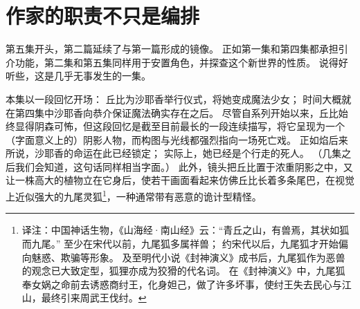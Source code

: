 \chapter[作家的职责不只是编排]{作家的职责不只是编排}



第五集开头，第二篇延续了与第一篇形成的镜像。
正如第一集和第四集都承担引介功能，第二集和第五集同样用于安置角色，并探查这个新世界的性质。
说得好听些，这是几乎无事发生的一集。

本集以一段回忆开场：
丘比为沙耶香举行仪式，将她变成魔法少女；
时间大概就在第四集中沙耶香向恭介保证魔法确实存在之后。
尽管自系列开始以来，丘比始终显得阴森可怖，但这段回忆是截至目前最长的一段连续描写，将它呈现为一个（字面意义上的）阴影人物，而构图与光线都强烈指向一场死亡戏。
正如焰后来所说，沙耶香的命运在此已经锁定；
实际上，她已经是个行走的死人。
（几集之后我们会知道，这句话同样相当字面。）
此外，镜头把丘比置于浓重阴影之中，又让一株高大的植物立在它身后，使若干画面看起来仿佛丘比长着多条尾巴，在视觉上近似强大的九尾灵狐\footnote{%
    译注：中国神话生物，《山海经·南山经》云：“青丘之山，有兽焉，其状如狐而九尾。”
    至少在宋代以前，九尾狐多属祥兽；
    约宋代以后，九尾狐才开始偏向魅惑、欺骗等形象。
    及至明代小说《封神演义》成书后，九尾狐作为恶兽的观念已大致定型，狐狸亦成为狡猾的代名词。
    在《封神演义》中，九尾狐奉女娲之命前去诱惑商纣王，化身妲己，做了许多坏事，使纣王失去民心与江山，最终引来周武王伐纣。
}，一种通常带有恶意的诡计型精怪\cite{smyers1999inari-jewel}。

